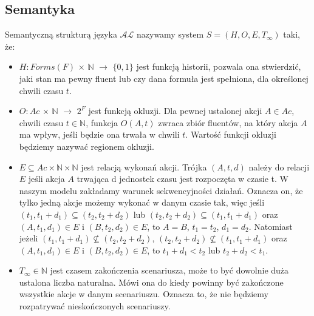 \subsection{Semantyka}
\begin{definition}
Semantyczną strukturą języka $\mathcal{AL}$ nazywamy system $ S=(H,O,E,T_{\infty }) $ taki, że:
	\begin{itemize}
		\item $ H: Forms(F) $ $\times$ $ \mathbb{N}$ $\longrightarrow$ $\{0,1\}$ jest funkcją historii, pozwala ona stwierdzić, jaki stan ma pewny fluent lub czy dana formuła jest spełniona, dla określonej chwili czasu $t$.
		\item $ O: Ac$ $\times$ $ \mathbb{N}$ $\longrightarrow$ $2^{F}$ jest funkcją okluzji. Dla pewnej ustalonej akcji $A \in Ac$, chwili czasu $t\in\mathbb{N}$, funkcja $O(A,t) $ zwraca zbiór fluentów, na który akcja $A$ ma wpływ, jeśli będzie ona trwała w chwili $t$. 
Wartość funkcji okluzji będziemy nazywać regionem okluzji. 
		\item $E\subseteq Ac \times \mathbb{N} \times \mathbb{N}$ jest relacją wykonań akcji. Trójka $(A,t,d)$ należy do relacji $E$ jeśli akcja $A$ trwająca d jednostek czasu jest rozpoczęta w czasie t. W naszym modelu zakładamy warunek sekwencyjności działań. Oznacza on, że tylko jedną akcje możemy wykonać w danym czasie tak, więc jeśli $(t_{1},t_{1}+d_{1}) \subseteq (t_{2},t_{2}+d_{2} )$ lub $(t_{2},t_{2}+d_{2} ) \subseteq (t_{1},t_{1}+d_{1}) $ oraz $(A,t_{1},d_{1})\in E$ i $(B,t_{2},d_{2})\in E$, to $A=B$, $t_{1}=t_{2}$, $d_{1}=d_{2} $. Natomiast jeżeli $(t_{1},t_{1}+d_{1}) \nsubseteq (t_{2},t_{2}+d_{2} )$, $(t_{2},t_{2}+d_{2} ) \nsubseteq (t_{1},t_{1}+d_{1}) $ oraz $(A,t_{1},d_{1})\in E$ i $(B,t_{2},d_{2})\in E$, to $t_{1}+d_{1}<t_{2}$ lub $t_{2}+d_{2}<t_{1}$.
		\item $T_{\infty } \in \mathbb{N} $ jest czasem zakończenia scenariusza, może to być dowolnie duża ustalona liczba naturalna. 
		Mówi ona do kiedy powinny być zakończone wszystkie akcje w danym scenariuszu. 
		Oznacza to, że nie będziemy rozpatrywać nieskończonych scenariuszy. 
	\end{itemize}
\end{definition}

